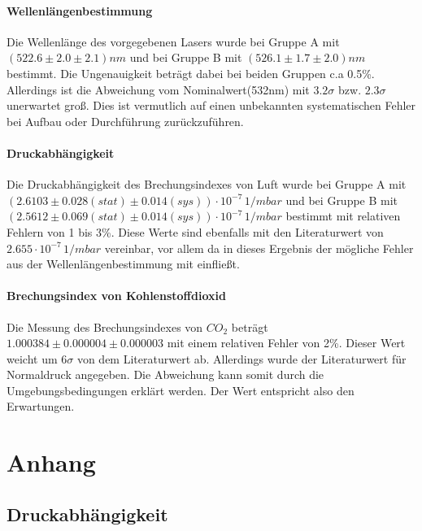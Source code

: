 \documentclass[12pt,a4paper]{article}
\begin{document}
\paragraph{Wellenlängenbestimmung}
Die Wellenlänge des vorgegebenen Lasers wurde bei Gruppe A mit $(522.6\pm 2.0 \pm 2.1) nm$ und bei Gruppe B mit $(526.1\pm 1.7\pm 2.0)nm$ bestimmt. Die Ungenauigkeit beträgt dabei bei beiden Gruppen c.a 0.5\%. Allerdings ist die Abweichung vom Nominalwert(532nm)
mit $3.2\sigma$ bzw. $2.3\sigma$ unerwartet groß. Dies ist vermutlich auf einen unbekannten systematischen Fehler bei Aufbau oder Durchführung zurückzuführen.
\paragraph{Druckabhängigkeit}
Die Druckabhängigkeit des Brechungsindexes von Luft wurde bei Gruppe A mit $(2.6103 \pm 0.028 (stat) \pm 0.014 (sys)) \cdot 10^{-7} \, \si{1/mbar}$ und bei Gruppe B mit $(2.5612 \pm 0.069 (stat) \pm 0.014 (sys)) \cdot 10^{-7} \, \si{1/mbar}$ bestimmt mit relativen Fehlern von 1 bis 3\%. Diese Werte sind ebenfalls mit den Literaturwert von $2.655\cdot 10^{-7} \, \si{1/mbar}$ vereinbar, vor allem da in dieses Ergebnis der mögliche Fehler aus der Wellenlängenbestimmung mit einfließt. 
\paragraph{Brechungsindex von Kohlenstoffdioxid}
Die Messung des Brechungsindexes von $CO_2$ beträgt $1.000384\pm 0.000004 \pm 0.000003$ mit einem relativen Fehler von 2\%. Dieser Wert weicht um $6\sigma$ von dem Literaturwert ab. Allerdings wurde der Literaturwert für Normaldruck angegeben. Die Abweichung kann somit durch die Umgebungsbedingungen erklärt werden. Der Wert entspricht also den Erwartungen.

\newpage
\section{Anhang}

\subsection{Druckabhängigkeit}
\end{document}

